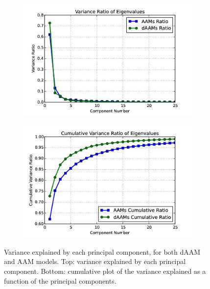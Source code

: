 \begin{figure}[h]
    \centering
    \begin{subfigure}[b]{0.45\textwidth}
            \includegraphics[width=\textwidth]{supports/Model_Analysis/var_ratio}
    \end{subfigure}
    \hfill
    \begin{subfigure}[b]{0.45\textwidth}
            \includegraphics[width=\textwidth]{supports/Model_Analysis/cumu_var_ratio}
    \end{subfigure}
    \caption{Variance explained by each principal component, for both dAAM and AAM models. Top: variance explained by each principal component. Bottom: cumulative plot of the variance explained as a function of the principal components.}
    \label{fig:compact}
\end{figure}

